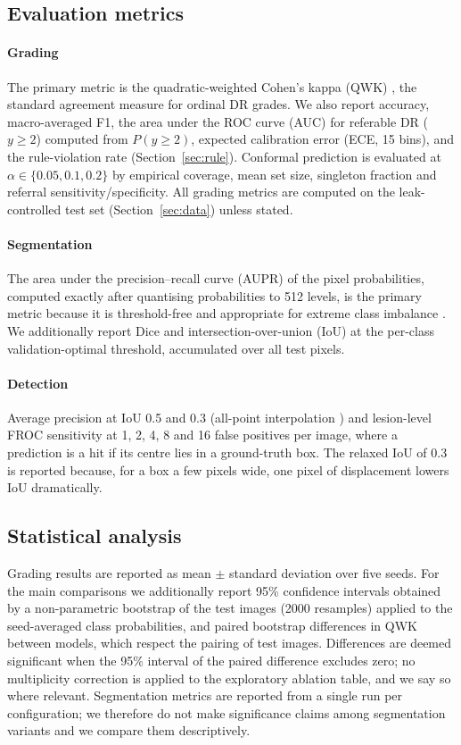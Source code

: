 \subsection{Evaluation metrics}
\paragraph{Grading} The primary metric is the quadratic-weighted Cohen's kappa (QWK) \citep{cohen1968kappa}, the standard agreement measure for ordinal DR grades. We also report accuracy, macro-averaged F1, the area under the ROC curve (AUC) for referable DR ($y\ge2$) computed from $P(y\ge2)$, expected calibration error (ECE, 15 bins), and the rule-violation rate (Section~\ref{sec:rule}). Conformal prediction is evaluated at $\alpha\in\{0.05,0.1,0.2\}$ by empirical coverage, mean set size, singleton fraction and referral sensitivity/specificity. All grading metrics are computed on the leak-controlled test set (Section~\ref{sec:data}) unless stated.

\paragraph{Segmentation} The area under the precision--recall curve (AUPR) of the pixel probabilities, computed exactly after quantising probabilities to 512 levels, is the primary metric because it is threshold-free and appropriate for extreme class imbalance \citep{saito2015pr}. We additionally report Dice \citep{dice1945} and intersection-over-union (IoU) at the per-class validation-optimal threshold, accumulated over all test pixels.

\paragraph{Detection} Average precision at IoU 0.5 and 0.3 (all-point interpolation \citep{padilla2021detmetrics}) and lesion-level FROC sensitivity at 1, 2, 4, 8 and 16 false positives per image, where a prediction is a hit if its centre lies in a ground-truth box. The relaxed IoU of 0.3 is reported because, for a box a few pixels wide, one pixel of displacement lowers IoU dramatically.

\subsection{Statistical analysis}
Grading results are reported as mean $\pm$ standard deviation over five seeds. For the main comparisons we additionally report 95\% confidence intervals obtained by a non-parametric bootstrap of the test images \citep{efron1993bootstrap} (2000 resamples) applied to the seed-averaged class probabilities, and paired bootstrap differences in QWK between models, which respect the pairing of test images. Differences are deemed significant when the 95\% interval of the paired difference excludes zero; no multiplicity correction is applied to the exploratory ablation table, and we say so where relevant. Segmentation metrics are reported from a single run per configuration; we therefore do not make significance claims among segmentation variants and we compare them descriptively.

